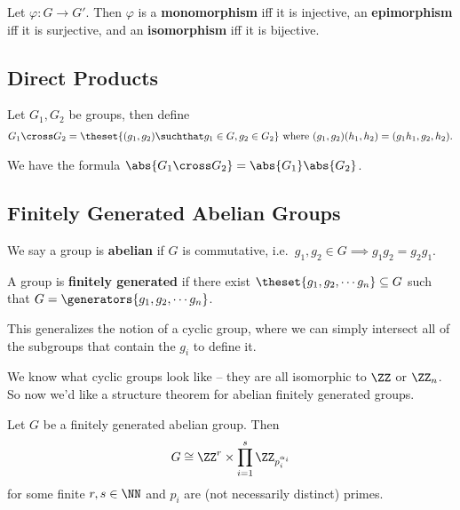 Let \(\varphi: G \to G'\). Then \(\varphi\) is a \textbf{monomorphism}
iff it is injective, an \textbf{epimorphism} iff it is surjective, and
an \textbf{isomorphism} iff it is bijective. 

\hypertarget{direct-products}{%
\subsection{Direct Products}\label{direct-products}}

Let \(G_1, G_2\) be groups, then define
\begin{align*}
G_1 \cross G_2 = \theset{(g_1, g_2) \suchthat g_1 \in G, g_2 \in G_2} \text{ where } (g_1, g_2)(h_1, h_2) = (g_1 h_1, g_2 ,h_2).
\end{align*}

We have the formula \(\abs{G_1 \cross G_2} = \abs{G_1} \abs{G_2}\).

\hypertarget{finitely-generated-abelian-groups}{%
\subsection{Finitely Generated Abelian
Groups}\label{finitely-generated-abelian-groups}}


We say a group is \textbf{abelian} if \(G\) is commutative,
i.e.~\(g_1, g_2 \in G \implies g_1 g_2 = g_2 g_1\).


A group is \textbf{finitely generated} if there exist
\(\theset{g_1, g_2, \cdots g_n} \subseteq G\) such that
\(G = \generators{g_1, g_2, \cdots g_n}\). 

This generalizes the notion of a cyclic group, where we can simply
intersect all of the subgroups that contain the \(g_i\) to define it.

We know what cyclic groups look like -- they are all isomorphic to
\(\ZZ\) or \(\ZZ_n\). So now we'd like a structure theorem for abelian
finitely generated groups.


Let \(G\) be a finitely generated abelian group. Then
\begin{align*}G \cong \ZZ^r \times \displaystyle\prod_{i=1}^s \ZZ_{p_i^{\alpha _i}}\end{align*}
for some finite \(r,s \in \NN\) and \(p_i\) are (not necessarily
distinct) primes. 

